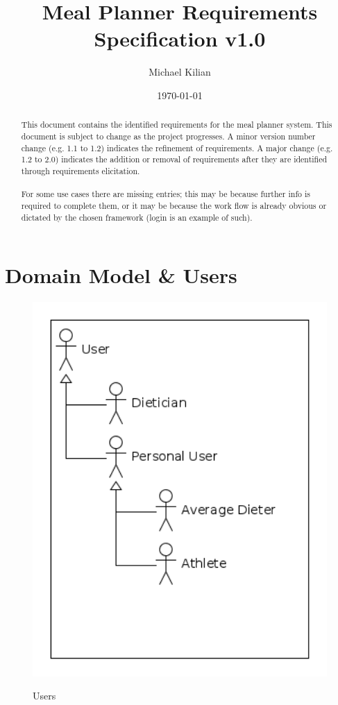 \documentclass[12pt]{article}
\begin{document}
\title{Meal Planner Requirements Specification v1.0}

\author{
        Michael Kilian
}
\date{\today}

\maketitle
\tableofcontents



\newpage
\begin{abstract}
This document contains the identified requirements for the meal planner system. This document is subject to change as the project progresses. A minor version number change (e.g. 1.1 to 1.2) indicates the refinement of requirements. A major change (e.g. 1.2 to 2.0) indicates the addition or removal of requirements after they are identified through requirements elicitation.\\\\
For some use cases there are missing entries; this may be because further info is required to complete them, or it may be because the work flow is already obvious or dictated by the chosen framework (login is an example of such).
\end{abstract}
\newpage

\section{Domain Model \& Users}
\begin{figure}[h]
\caption{Users}
\centering
\includegraphics[width = 1\textwidth]{Users.png}
\label{fig:DomainModelUsers}
\end{figure}
\end{document}
